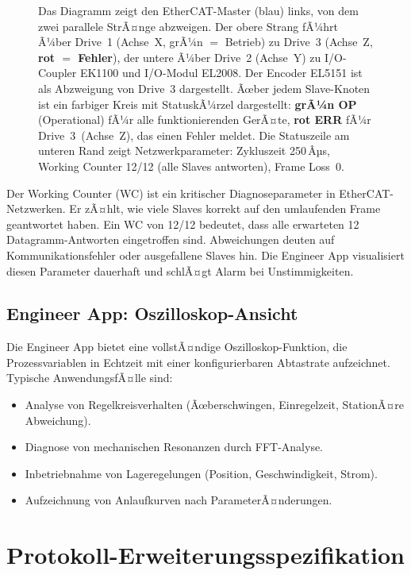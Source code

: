 ﻿\documentclass[12pt,a4paper]{article}
\begin{document}
\begin{figure}[H]
{  Das Diagramm zeigt den EtherCAT-Master (blau) links, von dem zwei parallele StrÃ¤nge
  abzweigen. Der obere Strang fÃ¼hrt Ã¼ber Drive~1 (Achse~X, grÃ¼n $=$ Betrieb) zu Drive~3
  (Achse~Z, \textbf{rot $=$ Fehler}), der untere Ã¼ber Drive~2 (Achse~Y) zu I/O-Coupler
  EK1100 und I/O-Modul EL2008. Der Encoder EL5151 ist als Abzweigung von Drive~3
  dargestellt. Ãœber jedem Slave-Knoten ist ein farbiger Kreis mit StatuskÃ¼rzel
  dargestellt: \textbf{grÃ¼n OP} (Operational) fÃ¼r alle funktionierenden GerÃ¤te,
  \textbf{rot ERR} fÃ¼r Drive~3~(Achse~Z), das einen Fehler meldet. Die
  Statuszeile am unteren Rand zeigt Netzwerkparameter: Zykluszeit 250\,Âµs, Working
  Counter 12/12 (alle Slaves antworten), Frame Loss~0.}
\label{fig:eng_topo_view}
\end{figure}

Der Working Counter (WC) ist ein kritischer Diagnoseparameter in EtherCAT-Netzwerken.
Er zÃ¤hlt, wie viele Slaves korrekt auf den umlaufenden Frame geantwortet haben. Ein WC
von 12/12 bedeutet, dass alle erwarteten 12 Datagramm-Antworten eingetroffen sind.
Abweichungen deuten auf Kommunikationsfehler oder ausgefallene Slaves hin. Die
Engineer App visualisiert diesen Parameter dauerhaft und schlÃ¤gt Alarm bei
Unstimmigkeiten.

\subsection{Engineer App: Oszilloskop-Ansicht}

Die Engineer App bietet eine vollstÃ¤ndige Oszilloskop-Funktion, die Prozessvariablen
in Echtzeit mit einer konfigurierbaren Abtastrate aufzeichnet. Typische AnwendungsfÃ¤lle
sind:

\begin{itemize}[leftmargin=2em]
  \item Analyse von Regelkreisverhalten (Ãœberschwingen, Einregelzeit, StationÃ¤re
    Abweichung).
  \item Diagnose von mechanischen Resonanzen durch FFT-Analyse.
  \item Inbetriebnahme von Lageregelungen (Position, Geschwindigkeit, Strom).
  \item Aufzeichnung von Anlaufkurven nach ParameterÃ¤nderungen.
\end{itemize}

\section{Protokoll-Erweiterungsspezifikation}
\label{sec:protocol}
\end{document}
